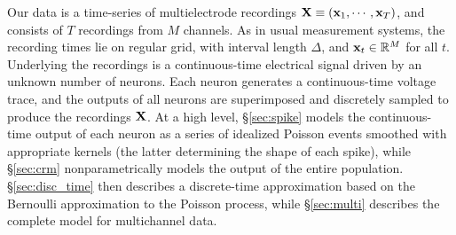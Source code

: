 Our data is a time-series of multielectrode recordings $\mathbf{X} \equiv (\mathbf{x}_1, \cdots, \mathbf{x}_T)$, and consists of $T$ recordings from $M$ channels. 
As in usual measurement systems, the recording times lie on regular grid, with interval length $\Delta$, and $\mathbf{x}_t \in \mathbb{R}^M$ for all $t$. 
Underlying the recordings is a continuous-time electrical signal driven by an unknown number of neurons. %
Each neuron generates a continuous-time voltage trace, and  the outputs of all neurons are superimposed and discretely sampled to produce 
the recordings $\mathbf{X}$.  At a high level, \S \ref{sec:spike} models the continuous-time output of each neuron as a
series of idealized Poisson events smoothed with appropriate kernels (the latter determining the shape of each spike), while
\S \ref{sec:crm} nonparametrically models the output of the entire population.
\S \ref{sec:disc_time} then describes a discrete-time approximation based on the Bernoulli approximation to the Poisson process, while
\S \ref{sec:multi} describes the complete model for multichannel data.
% 

